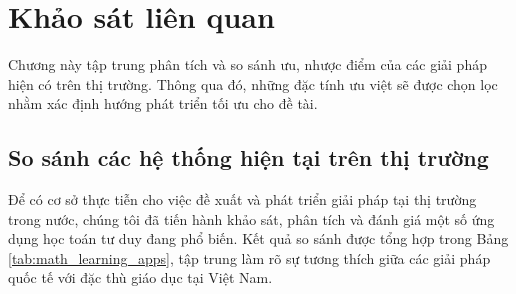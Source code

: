 \section{Khảo sát liên quan}
Chương này tập trung phân tích và so sánh ưu, nhược điểm của các giải pháp hiện có trên thị trường. Thông qua đó, những đặc tính ưu việt sẽ được chọn lọc nhằm xác định hướng phát triển tối ưu cho đề tài.

\subsection{So sánh các hệ thống hiện tại trên thị trường}

Để có cơ sở thực tiễn cho việc đề xuất và phát triển giải pháp tại thị trường trong nước, chúng tôi đã tiến hành khảo sát, phân tích và đánh giá một số ứng dụng học toán tư duy đang phổ biến. Kết quả so sánh được tổng hợp trong Bảng \ref{tab:math_learning_apps}, tập trung làm rõ sự tương thích giữa các giải pháp quốc tế với đặc thù giáo dục tại Việt Nam.

